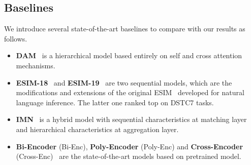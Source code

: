 


\subsection{Baselines}
We introduce several state-of-the-art baselines to compare with our results as follows.
\begin{itemize}
	 \item \textbf{DAM}~\cite{WuLCZDYZL18} is a hierarchical model based entirely on self and cross attention mechanisms.
	\item \textbf{ESIM-18}~\cite{abs-1802-02614} and \textbf{ESIM-19}~\cite{abs-1901-02609} are two sequential models, which are the modifications and extensions of the original ESIM~\cite{ChenZLWJI17} developed for natural language inference. The latter one ranked top on DSTC7 tasks.
	\item \textbf{IMN}~\cite{GuLL19} is a hybrid model with sequential characteristics at matching layer and hierarchical characteristics at aggregation layer.
	\item \textbf{Bi-Encoder} (Bi-Enc), \textbf{Poly-Encoder} (Poly-Enc) and \textbf{Cross-Encoder} (Cross-Enc)~\cite{humeau2019poly} are the state-of-the-art models based on pretrained model. 
\end{itemize}



